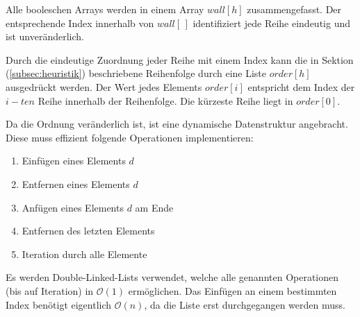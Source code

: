 \documentclass[a4paper, 12pt]{scrartcl}
\begin{document}
Alle booleschen Arrays werden in einem Array $wall[h]$ zusammengefasst. Der entsprechende Index innerhalb von $wall[\,]$ identifiziert jede Reihe eindeutig und ist unveränderlich.

Durch die eindeutige Zuordnung jeder Reihe mit einem Index kann die in Sektion (\ref{subsec:heuristik}) beschriebene Reihenfolge durch eine Liste $order[h]$ ausgedrückt werden. Der Wert jedes Elements $order[i]$ entspricht dem Index der $i-ten$ Reihe innerhalb der Reihenfolge. Die kürzeste Reihe liegt in $order[0]$.

Da die Ordnung veränderlich ist, ist eine dynamische Datenstruktur angebracht. Diese muss effizient folgende Operationen implementieren:
\begin{enumerate}
	\itemsep-2pt
	\item Einfügen eines Elements $d$
	\item Entfernen eines Elements $d$
	\item Anfügen eines Elements $d$ am Ende
	\item Entfernen des letzten Elements
	\item Iteration durch alle Elemente
\end{enumerate}
Es werden Double-Linked-Lists verwendet, welche alle genannten Operationen (bis auf Iteration) in $\mathcal{O}(1)$ ermöglichen. Das Einfügen an einem bestimmten Index benötigt eigentlich $\mathcal{O}(n)$, da die Liste erst durchgegangen werden muss.
\end{document}
